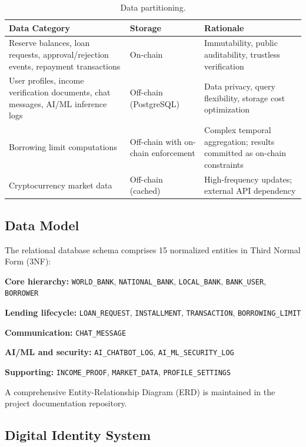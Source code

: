 \documentclass[11pt,a4paper]{article}
\newcommand{\tableheadfont}{\bfseries\small\color{PrimaryBlue}}
\newenvironment{moderntable}[1][H]{%
    \begin{table}[#1]\centering\small%
    \renewcommand{\arraystretch}{1.35}%
}{%
    \end{table}%
}
\begin{document}
\begin{moderntable}
\caption{Data partitioning.}
\begin{tabular}{@{} >{\raggedright}p{4.2cm} >{\raggedright}p{2.5cm} >{\raggedright\arraybackslash}p{5.3cm} @{}}
\toprule
\tableheadfont Data Category & \tableheadfont Storage & \tableheadfont Rationale \\
\midrule
\rowcolor{RowShade}
Reserve balances, loan requests, approval/rejection events, repayment transactions & On-chain & Immutability, public auditability, trustless verification \\
User profiles, income verification documents, chat messages, AI/ML inference logs & Off-chain (PostgreSQL) & Data privacy, query flexibility, storage cost optimization \\
\rowcolor{RowShade}
Borrowing limit computations & Off-chain with on-chain enforcement & Complex temporal aggregation; results committed as on-chain constraints \\
Cryptocurrency market data & Off-chain (cached) & High-frequency updates; external API dependency \\
\bottomrule
\end{tabular}
\end{moderntable}

\subsection{Data Model}

The relational database schema comprises 15 normalized entities in Third Normal Form (3NF):

\textbf{Core hierarchy:} \texttt{WORLD\_BANK}, \texttt{NATIONAL\_BANK}, \texttt{LOCAL\_BANK}, \texttt{BANK\_USER}, \texttt{BORROWER}

\textbf{Lending lifecycle:} \texttt{LOAN\_REQUEST}, \texttt{INSTALLMENT}, \texttt{TRANSACTION}, \texttt{BORROWING\_LIMIT}

\textbf{Communication:} \texttt{CHAT\_MESSAGE}

\textbf{AI/ML and security:} \texttt{AI\_CHATBOT\_LOG}, \texttt{AI\_ML\_SECURITY\_LOG}

\textbf{Supporting:} \texttt{INCOME\_PROOF}, \texttt{MARKET\_DATA}, \texttt{PROFILE\_SETTINGS}

A comprehensive Entity-Relationship Diagram (ERD) is maintained in the project documentation repository.

\subsection{Digital Identity System}
\end{document}
